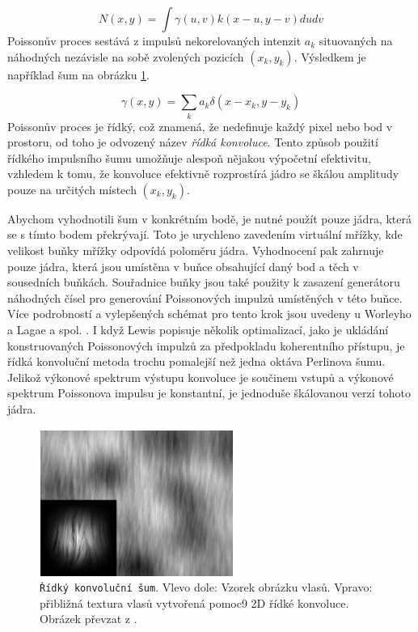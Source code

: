 \begin{equation}
	N(x,y) = \int\gamma(u,v)k(x-u,y-v)dudv
\end{equation}
Poissonův proces sestává z impulsů nekorelovaných intenzit $a_k$ situovaných na náhodných nezávisle na sobě zvolených pozicích $(x_k,y_k)$. Výsledkem je například šum na obrázku \ref{fig:SparseConvolutionNoise}.

\begin{equation}
	\gamma(x,y) = \sum_k a_k \delta(x-x_k,y-y_k)
\end{equation}
Poissonův proces je řídký, což znamená, že nedefinuje každý pixel nebo bod v prostoru, od toho je odvozený název \textit{řídká konvoluce}. Tento způsob použití řídkého impulsního šumu umožňuje alespoň nějakou výpočetní efektivitu, vzhledem k tomu, že konvoluce efektivně rozprostírá jádro se škálou amplitudy pouze na určitých místech $(x_k, y_k)$.

Abychom vyhodnotili šum v konkrétním bodě, je nutné použít pouze jádra, která se s tímto bodem překrývají. Toto je urychleno zavedením virtuální mřížky, kde velikost buňky mřížky odpovídá poloměru jádra. Vyhodnocení pak zahrnuje pouze jádra, která jsou umístěna v buňce obsahující daný bod a těch v sousedních buňkách. Souřadnice buňky jsou také použity k zasazení generátoru náhodných čísel pro generování Poissonových impulzů umístěných v této buňce. Více podrobností a vylepšených schémat pro tento krok jsou uvedeny u Worleyho \cite{worley1996} a Lagae a spol. \cite{Lagae09}. I když Lewis \cite{Lewis89} popisuje několik optimalizací, jako je ukládání konstruovaných Poissonových impulzů za předpokladu koherentního přístupu, je řídká konvoluční metoda trochu pomalejší než jedna oktáva Perlinova šumu. Jelikož výkonové spektrum výstupu konvoluce je součinem vstupů a výkonové spektrum Poissonova impulsu je konstantní, je jednoduše škálovanou verzí tohoto jádra.

\begin{figure}[H]
	\centering
	\includegraphics[scale=1]{obrazky-figures/SparseConvolutionNoise.png}
	\caption{\texttt{Řídký konvoluční šum}. Vlevo dole: Vzorek obrázku vlasů. Vpravo: přibližná textura vlasů vytvořená pomoc9 2D řídké konvoluce. Obrázek převzat z \cite{Lagae10}.}
	\label{fig:SparseConvolutionNoise}
\end{figure}

